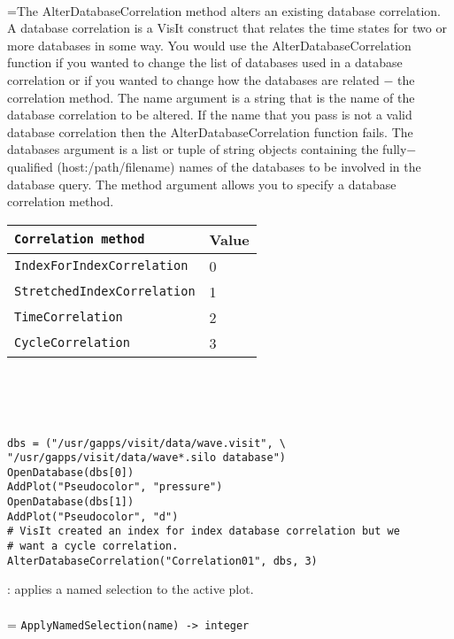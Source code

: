 \documentclass[10pt,a4paper]{report}
\begin{document}
 \\ 
\hangindent=\parindent The AlterDatabaseCorrelation method alters an existing database correlation. A database correlation is a VisIt construct that relates the time states for two or more databases in some way. You would use the AlterDatabaseCorrelation function if you wanted to change the list of databases used in a database correlation or if you wanted to change how the databases are related $-$ the correlation method. The name argument is a string that is the name of the database correlation to be altered. If the name that you pass is not a valid database correlation then the AlterDatabaseCorrelation function fails. The databases argument is a list or tuple of string objects containing the fully$-$qualified (host:/path/filename) names of the databases to be involved in the database query. The method argument allows you to specify a database correlation method. \\

\begin{tabular}{|l|l|}
\hline
\verb!Correlation method! & Value \\
\hline \hline
\verb!IndexForIndexCorrelation! & 0 \\
\verb!StretchedIndexCorrelation! & 1 \\
\verb!TimeCorrelation! & 2 \\
\verb!CycleCorrelation! & 3 \\
\hline
\end{tabular} \\[-2mm]
\\[-3mm] 

\\[-6mm]
\begin{verbatim}dbs = ("/usr/gapps/visit/data/wave.visit", \
"/usr/gapps/visit/data/wave*.silo database")
OpenDatabase(dbs[0])
AddPlot("Pseudocolor", "pressure")
OpenDatabase(dbs[1])
AddPlot("Pseudocolor", "d")
# VisIt created an index for index database correlation but we 
# want a cycle correlation.
AlterDatabaseCorrelation("Correlation01", dbs, 3)
\end{verbatim}
\newpage


{}
: applies a named selection to the active plot.\\[-3mm]

 \\ 
\hangindent=\parindent 
\verb!ApplyNamedSelection(name) -> integer!\\ [-3mm]
\end{document}
